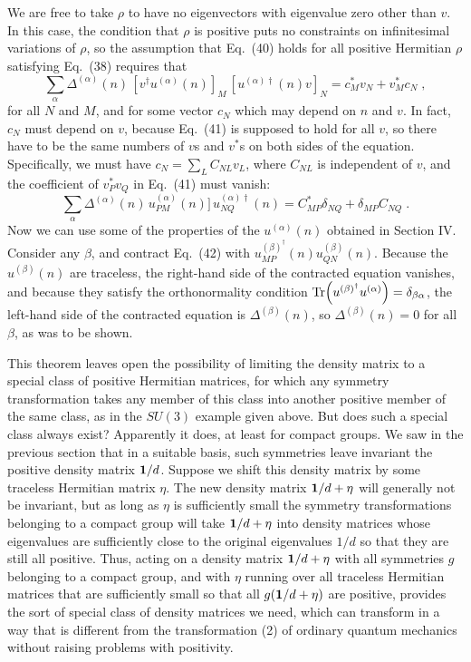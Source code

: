 We are free to take $\rho$ to have no eigenvectors with eigenvalue zero other than $v$. In this case, the condition that $\rho$ is positive puts no constraints on infinitesimal variations of $\rho$, so the assumption that Eq.~(40) holds for all positive Hermitian $\rho$ satisfying Eq.~(38) requires that 
\begin{equation}
\sum_\alpha  \Delta^{(\alpha)}(n)\, [v^\dagger u^{(\alpha)}(n)]_M\, [u^{(\alpha)\dagger}(n)v]_N =c_M^*v_N+v_M^*c_N\;,
\end{equation}
for all $N$ and $M$, and for some vector $c_N$ which may depend on $n$ and $v$.  In fact, $c_N$ must depend on $v$, because Eq.~(41) is supposed to hold for all $v$, so there have to be the same numbers of $v$s and $v^*$s on both sides of the equation.  Specifically, we must have $c_N=\sum_L C_{NL}v_L$, where $C_{NL}$ is independent of $v$, and the coefficient of $v_P^*v_Q$ in Eq.~(41) must vanish:
\begin{equation}
\sum_\alpha  \Delta^{(\alpha)}(n)\,  u_{PM}^{(\alpha)}(n)]\, u_{NQ}^{(\alpha)\dagger}(n) =C_{MP}^*\delta_{NQ}+\delta_{MP}C_{NQ}\;.
\end{equation}
Now we can use some of the properties of the $u^{(\alpha)}(n)$ obtained in Section IV.  Consider any $\beta$,  and contract Eq.~(42) with $u^{(\beta)^\dagger}_{MP}(n)u^{(\beta)}_{QN}(n)$.  Because the $u^{(\beta)}(n)$ are traceless, the right-hand side of the contracted equation   vanishes, and because they satisfy the orthonormality condition ${\rm Tr}\Big(u^{(\beta)^\dagger}u^{(\alpha)}\Big)=\delta_{\beta\alpha}$, the left-hand side of the  contracted equation is $\Delta^{(\beta)}(n)$, so $\Delta^{(\beta)}(n)=0$ for all $\beta$, as was to be shown.

This theorem leaves open the possibility of limiting the density matrix to a special class of positive Hermitian matrices, for which  any symmetry transformation takes any member of this class into another positive member of the same class, as in the $SU(3)$ example given above.  But does such a special class always exist?  Apparently it does, at least for compact groups.  We saw in the previous section that in a suitable basis, such symmetries leave invariant the positive density matrix ${\mbox{\boldmath{$1$}}}/d$.  Suppose we shift this density matrix by some traceless Hermitian matrix $\eta$.  The new density matrix  ${\mbox{\boldmath{$1$}}}/d+\eta$ will generally not  be invariant, but  as long as $\eta$ is sufficiently small the symmetry transformations  belonging to a compact group will take ${\mbox{\boldmath{$1$}}}/d+\eta$ into  density matrices whose eigenvalues are sufficiently close to the original eigenvalues $1/d$ so that they are still all positive.  Thus,  acting  on a density matrix  ${\mbox{\boldmath{$1$}}}/d+\eta$ with all symmetries $g$ belonging to a compact group, and with $\eta$  running over all traceless Hermitian matrices that are   sufficiently small so that all $g({\mbox{\boldmath{$1$}}}/d+\eta)$  are positive, provides the sort of special class of density matrices we need, which can transform in a way that is different from the transformation (2) of   ordinary quantum mechanics without raising problems with positivity.

